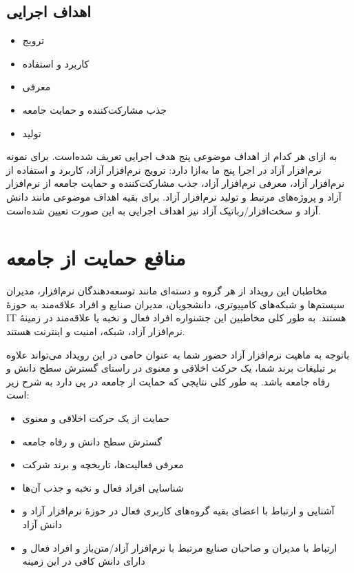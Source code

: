 \documentclass{article}
\begin{document}
\subsection{اهداف اجرایی}

\begin{flushright}
\begin{itemize}
\item ترویج
\item کاربرد و استفاده
\item معرفی
\item جذب مشارکت‌کننده و حمایت جامعه
\item تولید
\end{itemize}
\end{flushright}

به ازای هر کدام از اهداف موضوعی پنج هدف اجرایی تعریف شده‌است. برای نمونه نرم‌افزار آزاد در اجرا پنج ما به‌ازا دارد: ترویج نرم‌افزار آزاد، کاربرد و استفاده از نرم‌افزار آزاد، معرفی نرم‌افزار آزاد، جذب مشارکت‌کننده و حمایت جامعه از نرم‌افزار آزاد و پروژه‌های مرتبط و تولید نرم‌افزار آزاد. برای بقیه اهداف موضوعی مانند دانش آزاد و سخت‌افزار/رباتیک آزاد نیز اهداف اجرایی به این صورت تعیین شده‌است.

\section{منافع حمایت از جامعه}
مخاطبان این رویداد از هر گروه و دسته‌ای مانند توسعه‌دهندگان نرم‌افزار، مدیران سیستم‌ها و شبکه‌های کامپیوتری، دانشجویان، مدیران صنایع و افراد علاقه‌مند به حوزهٔ IT  هستند. به طور کلی مخاطبین این جشنواره افراد فعال و نخبه یا علاقه‌مند در زمینهٔ نرم‌افزار آزاد، شبکه، امنیت و اینترنت هستند.

\begin{flushright}

باتوجه به ماهیت نرم‌افزار آزاد حضور شما به عنوان حامی در این رویداد می‌تواند علاوه‌ بر تبلیغات برند شما، یک حرکت اخلاقی و معنوی در راستای گسترش سطح دانش و رفاه جامعه باشد. به طور کلی نتایجی که حمایت از جامعه در پی دارد به شرح زیر است:

\begin{itemize}
\item حمایت از یک حرکت اخلاقی و معنوی
\item گسترش سطح دانش و رفاه جامعه
\item معرفی فعالیت‌ها، تاریخچه و برند شرکت
\item شناسایی افراد فعال و نخبه و جذب آن‌ها
\item آشنایی و ارتباط با اعضای بقیه گروه‌های کاربری فعال در حوزهٔ نرم‌افزار آزاد و دانش آزاد
\item ارتباط با مدیران و صاحبان صنایع مرتبط با نرم‌افزار آزاد/متن‌باز و افراد فعال و دارای دانش کافی در این زمینه
\end{itemize}

\end{flushright}
\end{document}
